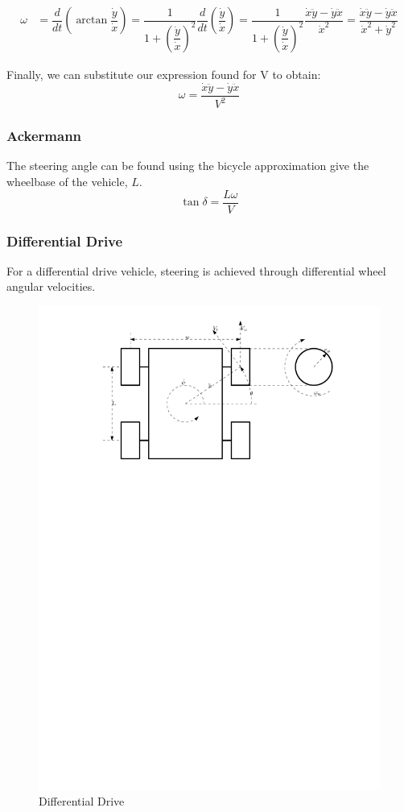 \documentclass[10pt]{book}
\begin{document}
\begin{align*}
\omega &= \dfrac{d}{dt} \left(\arctan{\dfrac{\dot{y}}{\dot{x}}} \right) 
= \dfrac{1}{1 + \left(\dfrac{\dot{y}}{\dot{x}}\right)^2} \dfrac{d}{dt} 
    \left(\dfrac{\dot{y}}{\dot{x}}\right)
= \dfrac{1}{1 + \left(\dfrac{\dot{y}}{\dot{x}}\right)^2}  \dfrac{\dot{x}\ddot{y} - \dot{y}\ddot{x}}{\dot{x}^2}
= \dfrac{\dot{x}\ddot{y} - \dot{y}\ddot{x}}{\dot{x}^2 + \dot{y}^2}
\end{align*}

Finally, we can substitute our expression found for V to obtain:
%
$$\omega = \dfrac{\dot{x}\ddot{y} - \dot{y}\ddot{x}}{V^2}$$
%
\subsubsection{Ackermann}
The steering angle can be found using the bicycle approximation give the wheelbase
of the vehicle, $L$.
%
$$\tan{\delta} = \frac{L\omega}{V}$$

\subsubsection{Differential Drive}
For a differential drive vehicle, steering is achieved through differential wheel angular velocities.

\begin{figure}[htp]
	\centering
	\includegraphics[width=0.7\linewidth]{fig/diff-drive}
	\caption{Differential Drive}
	\label{fig:diff-drive}
\end{figure}
\end{document}
